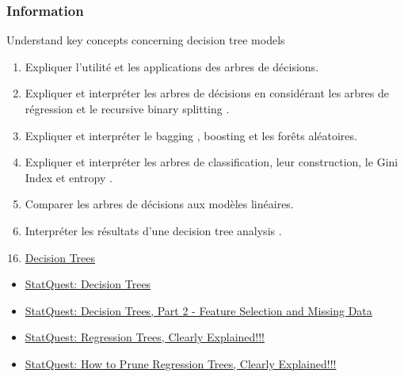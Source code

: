 \documentclass[12pt, titlepage, french]{report}
\begin{document}
\subsubsection{Information}

\begin{distributions}[Objective]
Understand key concepts concerning decision tree models
\end{distributions}

\begin{outcomes}
\begin{enumerate}
	\item	Expliquer l'utilité et les applications des arbres de décisions.
	\item	Expliquer et interpréter les arbres de décisions en considérant les arbres de régression et le \og recursive binary splitting \fg{}.
	\item	Expliquer et interpréter le \og bagging \fg{}, \og boosting \fg{} et les forêts aléatoires.
	\item	Expliquer et interpréter les arbres de classification, leur construction, le \og Gini Index \fg{} et \og entropy \fg{}.
	\item	Comparer les arbres de décisions aux modèles linéaires.
	\item	Interpréter les résultats d'une \og decision tree analysis \fg{}.
\end{enumerate}
\end{outcomes}

\begin{ASM_chapter}
\begin{enumerate}
  \setcounter{enumi}{15}
	\item	\hyperref[DECISION-TREES]{Decision Trees}
\end{enumerate}
\end{ASM_chapter}

\begin{YTB_vids}
\begin{itemize}
	\item	\href{https://www.youtube.com/watch?v=7VeUPuFGJHk&list=PLblh5JKOoLUICTaGLRoHQDuF_7q2GfuJF&index=34}{StatQuest: Decision Trees}
	\item	\href{https://www.youtube.com/watch?v=wpNl-JwwplA&list=PLblh5JKOoLUICTaGLRoHQDuF_7q2GfuJF&index=35}{StatQuest: Decision Trees, Part 2 - Feature Selection and Missing Data}
	\item	\href{https://www.youtube.com/watch?v=g9c66TUylZ4&list=PLblh5JKOoLUICTaGLRoHQDuF_7q2GfuJF&index=36}{StatQuest: Regression Trees, Clearly Explained!!!}
	\item	\href{https://www.youtube.com/watch?v=D0efHEJsfHo&list=PLblh5JKOoLUICTaGLRoHQDuF_7q2GfuJF&index=37}{StatQuest: How to Prune Regression Trees, Clearly Explained!!!}
\end{itemize}
\end{YTB_vids}
\end{document}
